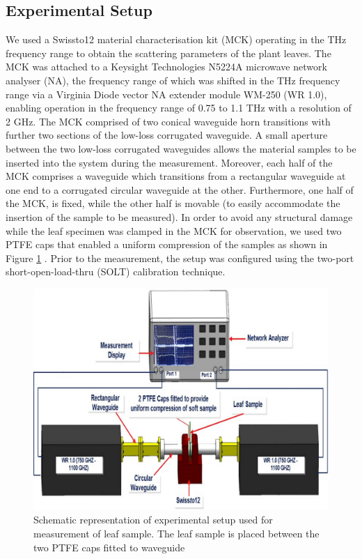\documentclass[preprints,article,accept,moreauthors,pdftex]{Definitions/mdpi}
\renewcommand{\^}{\hat}  %
\begin{document}
\subsection{Experimental Setup}
%
{We used a Swissto12 material characterisation kit (MCK) operating in the THz frequency range to obtain the scattering parameters of the plant leaves. The MCK was attached to a Keysight Technologies N5224A microwave network analyser (NA), the frequency range of which was shifted in the THz frequency range via a Virginia Diode vector NA extender module WM-250 (WR 1.0), enabling operation in the frequency range of 0.75 to 1.1 THz with a resolution of 2 GHz. The MCK comprised of two conical waveguide horn transitions with further two sections of the low-loss corrugated waveguide. A small aperture between the two low-loss corrugated waveguides allows the material samples to be inserted into the system during the measurement. Moreover, each half of the MCK comprises a waveguide which transitions from a rectangular waveguide at one end to a corrugated circular waveguide at the other. Furthermore, one half of the MCK, is fixed, while the other half is movable (to easily accommodate the insertion of the sample to be measured)}. In order to avoid any structural damage while the leaf specimen was clamped in the MCK for observation, we used two PTFE caps that enabled a uniform compression of the samples as shown in Figure \ref{fig:setup8c} . Prior to the measurement, the setup was configured using the two-port short-open-load-thru (SOLT) calibration technique.

\begin{figure}[t!]
	\centering
	\includegraphics[trim={0cm 0cm 0cm 0cm}, clip,width=.65\linewidth]{setup8c.jpg}
	\caption{Schematic representation of experimental setup used for measurement of leaf sample. The leaf sample is placed between the two PTFE caps fitted to waveguide}\label{fig:setup8c}
\end{figure}
\end{document}
